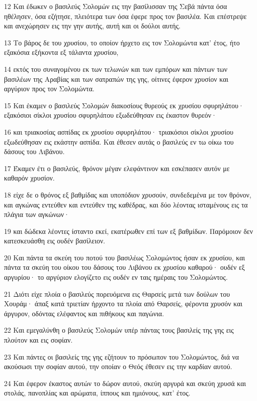 \par 12 Και έδωκεν ο βασιλεύς Σολομών εις την βασίλισσαν της Σεβά πάντα όσα ηθέλησεν, όσα εζήτησε, πλειότερα των όσα έφερε προς τον βασιλέα. Και επέστρεψε και ανεχώρησεν εις την γην αυτής, αυτή και οι δούλοι αυτής.
\par 13 Το βάρος δε του χρυσίου, το οποίον ήρχετο εις τον Σολομώντα κατ' έτος, ήτο εξακόσια εξήκοντα εξ τάλαντα χρυσίου,
\par 14 εκτός του συναγομένου εκ των τελωνών και των εμπόρων και πάντων των βασιλέων της Αραβίας και των σατραπών της γης, οίτινες έφερον χρυσίον και αργύριον προς τον Σολομώντα.
\par 15 Και έκαμεν ο βασιλεύς Σολομών διακοσίους θυρεούς εκ χρυσίου σφυρηλάτου· εξακόσιοι σίκλοι χρυσίου σφυρηλάτου εξωδεύθησαν εις έκαστον θυρεόν·
\par 16 και τριακοσίας ασπίδας εκ χρυσίου σφυρηλάτου· τριακόσιοι σίκλοι χρυσίου εξωδεύθησαν εις εκάστην ασπίδα. Και έθεσεν αυτάς ο βασιλεύς εν τω οίκω του δάσους του Λιβάνου.
\par 17 Έκαμεν έτι ο βασιλεύς, θρόνον μέγαν ελεφάντινον και εσκέπασεν αυτόν με καθαρόν χρυσίον.
\par 18 είχε δε ο θρόνος εξ βαθμίδας και υποπόδιον χρυσούν, συνδεδεμένα με τον θρόνον, και αγκώνας εντεύθεν και εντεύθεν της καθέδρας, και δύο λέοντας ισταμένους εις τα πλάγια των αγκώνων·
\par 19 και δώδεκα λέοντες ίσταντο εκεί, εκατέρωθεν επί των εξ βαθμίδων. Παρόμοιον δεν κατεσκευάσθη εις ουδέν βασίλειον.
\par 20 Και πάντα τα σκεύη του ποτού του βασιλέως Σολομώντος ήσαν εκ χρυσίου, και πάντα τα σκεύη του οίκου του δάσους του Λιβάνου εκ χρυσίου καθαρού· ουδέν εξ αργυρίου· το αργύριον ελογίζετο εις ουδέν εν ταις ημέραις του Σολομώντος.
\par 21 Διότι είχε πλοία ο βασιλεύς πορευόμενα εις Θαρσείς μετά των δούλων του Χουράμ· άπαξ κατά τριετίαν ήρχοντο τα πλοία από Θαρσείς, φέροντα χρυσόν και άργυρον, οδόντας ελέφαντος και πιθήκους και παγώνια.
\par 22 Και εμεγαλύνθη ο βασιλεύς Σολομών υπέρ πάντας τους βασιλείς της γης εις πλούτον και εις σοφίαν.
\par 23 Και πάντες οι βασιλείς της γης εζήτουν το πρόσωπον του Σολομώντος, διά να ακούσωσι την σοφίαν αυτού, την οποίαν ο Θεός έθεσεν εις την καρδίαν αυτού.
\par 24 Και έφερον έκαστος αυτών το δώρον αυτού, σκεύη αργυρά και σκεύη χρυσά και στολάς, πανοπλίας και αρώματα, ίππους και ημιόνους, κατ' έτος.
